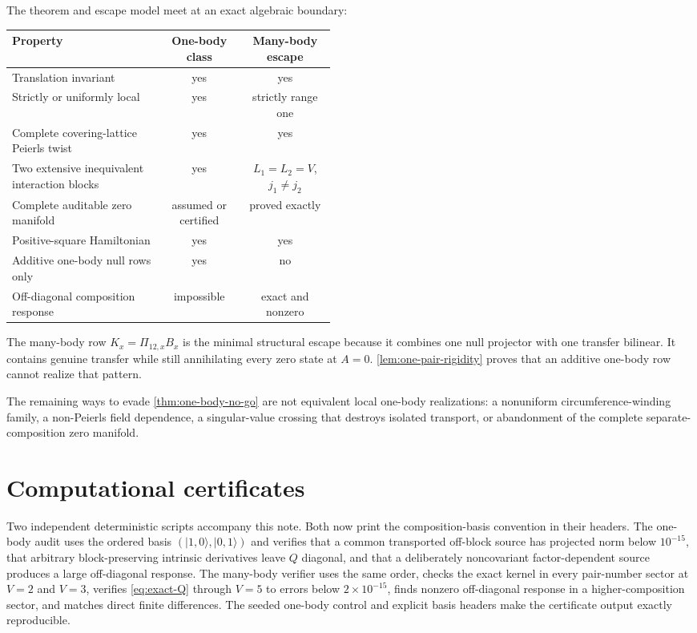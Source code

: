 \documentclass[11pt]{article}
\theoremstyle{remark}
\begin{document}
The theorem and escape model meet at an exact algebraic boundary:
\begin{center}
\begin{tabular}{@{}p{0.47\linewidth}cc@{}}
\toprule
Property & One-body class & Many-body escape\\
\midrule
Translation invariant & yes & yes\\
Strictly or uniformly local & yes & strictly range one\\
Complete covering-lattice Peierls twist & yes & yes\\
Two extensive inequivalent interaction blocks & yes & $L_1=L_2=V$, $j_1\ne j_2$\\
Complete auditable zero manifold & assumed or certified & proved exactly\\
Positive-square Hamiltonian & yes & yes\\
Additive one-body null rows only & yes & no\\
Off-diagonal composition response & impossible & exact and nonzero\\
\bottomrule
\end{tabular}
\end{center}

The many-body row $K_x=\Pi_{12,x}B_x$ is the minimal structural escape because
it combines one null projector with one transfer bilinear.  It contains
genuine transfer while still annihilating every zero state at $A=0$.
\cref{lem:one-pair-rigidity} proves that an additive one-body row cannot
realize that pattern.

The remaining ways to evade \cref{thm:one-body-no-go} are not equivalent local
one-body realizations: a nonuniform circumference-winding family, a
non-Peierls field dependence, a singular-value crossing that destroys
isolated transport, or abandonment of the complete separate-composition zero
manifold.

\section{Computational certificates}

Two independent deterministic scripts accompany this note.  Both now print the
composition-basis convention in their headers.  The one-body audit uses the
ordered basis $(|1,0\rangle,|0,1\rangle)$ and verifies that a common transported
off-block source has projected norm below $10^{-15}$, that arbitrary
block-preserving intrinsic derivatives leave $Q$ diagonal, and that a
deliberately noncovariant factor-dependent source produces a large
off-diagonal response.  The many-body verifier uses the same order, checks the
exact kernel in every pair-number sector at $V=2$ and $V=3$, verifies
\eqref{eq:exact-Q} through $V=5$ to errors below $2\times10^{-15}$, finds
nonzero off-diagonal response in a higher-composition sector, and matches
direct finite differences.  The seeded one-body control and explicit basis
headers make the certificate output exactly reproducible.
\end{document}
